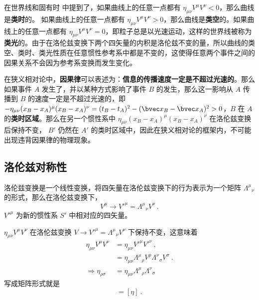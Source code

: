 在世界线和固有时 中提到了，如果曲线上的任意一点都有 $\eta_{\mu\nu}V^\mu V^\nu<0$，那么曲线是\textbf{类时}的。
如果曲线上的任意一点都有 $\eta_{\mu\nu}V^\mu V^\nu>0$，那么曲线是\textbf{类空}的。如果曲线上的任意一点都有 $\eta_{\mu\nu}V^\mu V^\nu=0$，即粒子总是以光速运动，这样的世界线被称为\textbf{类光}的。由于在洛伦兹变换下两个四矢量的内积是洛伦兹不变的量，所以曲线的类空、类时、类光性质在任意惯性参考系中都是不变的，这使得任意两个事件之间的因果关系不会因为参考系变换而发生变化。

在狭义相对论中，\textbf{因果律}可以表述为：\textbf{信息的传播速度一定是不超过光速的}。那么如果事件 $A$ 发生了，并以某种方式影响了事件 $B$ 的发生，那么这一影响从 $A$ 传播到 $B$ 的速度一定是不超过光速的，即 $-\eta_{\mu\nu} (x_B-x_A)^\mu (x_B-x_A)^\nu = (t_B-t_A)^2-(\bvec x_B-\bvec x_A)^2>0$，$B$ 在 $A$ 的\textbf{类时区域}。那么在另一个惯性系中 $\eta_{\mu\nu} (x_B-x_A)^\mu (x_B-x_A)^\nu$ 在洛伦兹变换后保持不变， $B'$ 仍然在 $A'$ 的类时区域中，因此在狭义相对论的框架内，不可能出现违背因果律的物理现象。
\subsection{洛伦兹对称性}
洛伦兹变换是一个线性变换，将四矢量在洛伦兹变换下的行为表示为一个矩阵 $\Lambda^\mu{}_\nu $ 的形式，那么在洛伦兹变换下，
\begin{equation}
V^\mu \rightarrow {V'}^\mu = \Lambda^\mu{}_\nu V^\nu~.
\end{equation}
${V'}^\mu$ 为新的惯性系 $S'$ 中相对应的四矢量。

$\eta_{\mu\nu}V^\mu V^\nu$ 在洛伦兹变换 $V\rightarrow {V'}^\mu = \Lambda^\mu{}_\nu V^\nu$ 下保持不变，这意味着
\begin{equation}
\begin{aligned}
\eta_{\mu\nu } V^\mu V^\nu &= \eta_{\mu\nu }{V'}^\mu {V'}^\nu ~,
\\
&=\eta_{\mu\nu} \Lambda^\mu{}_{\rho}V^{\rho} \Lambda^\nu{}_{\sigma} V^{\sigma}
~.\\
\Rightarrow \eta_{\rho\sigma}&=\eta_{\mu\nu}\Lambda^{\mu}{}_{\rho}\Lambda^{\nu}{}_{\sigma}
\end{aligned}
\end{equation}
写成矩阵形式就是
\begin{equation}
[\Lambda^T][\eta][\Lambda] = [\eta]~.
\end{equation}


